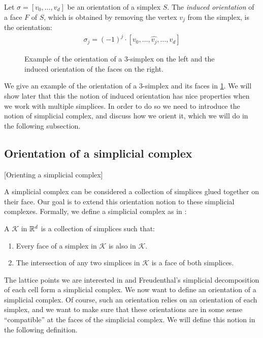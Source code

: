 \begin{definition}
	Let $\sigma = [v_0, \dots, v_{d}]$ be an orientation of a simplex $S$. The \emph{induced orientation} of a face $F$ of $S$, which is obtained by removing the vertex $v_j$ from the simplex, is the orientation:
	\begin{align*}
		\sigma_j = (-1)^j \cdot [v_0, \dots, \hat{v_j}, \dots, v_{d}]
	\end{align*}
\end{definition}

\begin{figure}[ht]
	\centering
	\caption[Orientation of a simplex]{Example of the orientation of a 3-simplex on the left and the induced orientation of the faces on the right.}
	\label{fig:orientation_of_simplex}
\end{figure}

We give an example of the orientation of a 3-simplex and its faces in \cref{fig:orientation_of_simplex}. We will show later that this the notion of induced orientation has nice properties when we work with multiple simplices. In order to do so we need to introduce the notion of simplicial complex, and discuss how we orient it, which we will do in the following subsection.

\subsection{Orientation of a simplicial complex}[Orienting a simplicial complex]

A simplicial complex can be considered a collection of simplices glued together on their face. Our goal is to extend this orientation notion to these simplicial complexes. Formally, we define a simplicial complex as in :

\begin{definition}
	A  $\mathcal{K}$ in $\mathbb{R}^d$ is a collection of simplices such that:
	\begin{enumerate}
		\item Every face of a simplex in $\mathcal{K}$ is also in $\mathcal{K}$.
		\item The intersection of any two simplices in $\mathcal{K}$ is a face of both simplices.
	\end{enumerate}
\end{definition}

The lattice points we are interested in and Freudenthal's simplicial decomposition of each cell form a simplicial complex. We now want to define an orientation of a simplicial complex. Of course, such an orientation relies on an orientation of each simplex, and we want to make sure that these orientations are in some sense ``compatible'' at the faces of the simplicial complex. We will define this notion in the following definition.


